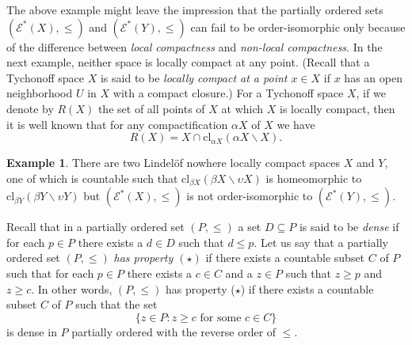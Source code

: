 \documentclass{amsart}
\theoremstyle{definition}
\newtheorem{example}[theorem]{Example}
\theoremstyle{remark}
\theoremstyle{notation}
\numberwithin{equation}{section}
\begin{document}
The above example might leave the impression that the  partially ordered sets $({\mathscr E}^*(X),\leq)$ and $({\mathscr E}^*(Y),\leq)$ can fail to be order-isomorphic only because of the difference between {\em local compactness} and {\em non-local compactness}. In the next example, neither space is locally compact at any point.  (Recall that a Tychonoff space $X$ is said to be {\em locally compact at a point $x\in X$} if $x$ has an open neighborhood $U$ in $X$ with a compact closure.) For a Tychonoff space $X$, if we denote by $R(X)$ the set of all  points of $X$ at which $X$ is locally compact, then it is well known that for any compactification $\alpha X$ of $X$ we have
\[R(X)=X\cap\mbox{cl}_{\alpha X}(\alpha X\backslash X).\]

\begin{example}\label{IHF}
There are two Lindel\"{o}f nowhere locally compact spaces $X$ and $Y$, one of which is countable such that $\mbox{cl}_{\beta X}(\beta X\backslash\upsilon X)$ is homeomorphic to $\mbox{cl}_{\beta Y}(\beta Y\backslash\upsilon Y)$ but $({\mathscr E}^*(X),\leq)$ is not order-isomorphic to $({\mathscr E}^*(Y),\leq)$.

Recall that in a partially ordered set $(P,\leq)$ a set $D\subseteq P$ is said to be {\em dense} if for each $p\in P$ there exists a $d\in D$ such that $d\leq p$. Let us say that a partially ordered set $(P,\leq)$ {\em has property $(\star)$} if there exists a countable subset $C$ of $P$ such that for each $p\in P$ there exists a $c\in C$ and a $z\in P$ such that $z\geq p$ and $z\geq c$. In other words, $(P,\leq)$ has property ($\star$) if there exists a countable subset $C$ of $P$ such that the set
\[\{z\in P:z\geq c\mbox{ for some }c\in C\}\]
is dense in  $P$ partially ordered with the reverse order of $\leq$.


\end{example}
\end{document}
